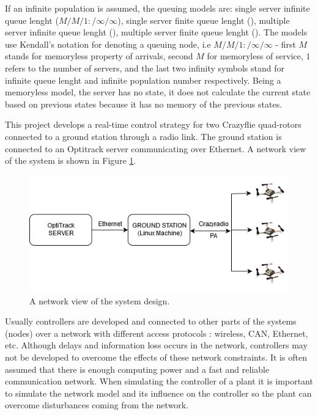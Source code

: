 If an infinite population is assumed, the queuing models are: single server infinite queue lenght ($M/M/1:/\infty/\infty$), single server finite queue lenght (), multiple server infinite queue lenght (), multiple server finite queue lenght (). The models use Kendall's notation for denoting a queuing node, i.e $M/M/1:/\infty/\infty$ - first $M$ stands for memoryless property of arrivals, second $M$ for memoryless of service, $1$ refers to the number of servers, and the last two infinity symbols stand for infinite queue lenght and infinite population number respectively. Being a memoryless model, the server has no state, it does not calculate the current state based on previous states because it has no memory of the previous states. 





This project develops a real-time control strategy for two Crazyflie quad-rotors connected to a ground station through a radio link. The ground station is connected to an Optitrack server communicating over Ethernet. A network view of the system is shown in Figure \ref{figure:system_design}.

\begin{figure}[H]
\centering
 \includegraphics[scale=0.5]{Figures/crazyflie_system.png}
 \caption{A network view of the system design.}
 \label{figure:system_design}
\end{figure}

Usually controllers are developed and connected to other parts of the systems (nodes) over a network with different access protocols \cite{truetime}: wireless, CAN, Ethernet, etc. Although delays and information loss occurs in the network, controllers may not be developed to overcome the effects of these network constraints. It is often assumed that there is enough computing power and a fast and reliable communication network. When simulating the controller of a plant it is important to simulate the network model and its influence on the controller so the plant can overcome disturbances coming from the network.\\



